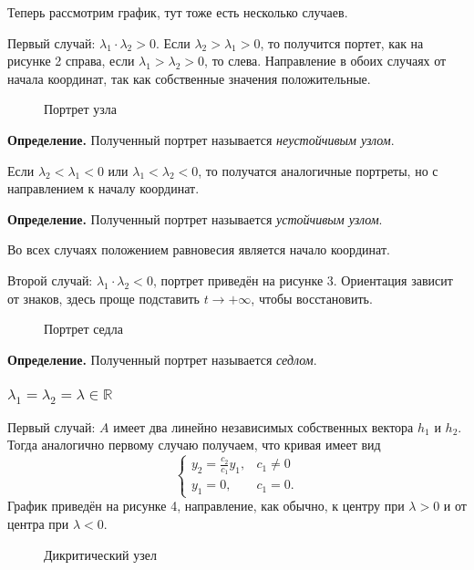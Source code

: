 Теперь рассмотрим график, тут тоже есть несколько случаев.

Первый случай: $\lambda_1 \cdot \lambda_2 > 0$.
Если $\lambda_2 > \lambda_1 > 0$, то получится портет, как на рисунке 2 справа, если $\lambda_1 > \lambda_2 > 0$, то слева.
Направление в обоих случаях от начала координат, так как собственные значения положительные.

\begin{figure}[ht]
    \centering
    \caption{Портрет узла}
\end{figure}

\textbf{Определение.} Полученный портрет называется \textit{неустойчивым узлом}.

Если $\lambda_2 < \lambda_1 < 0$ или $\lambda_1 < \lambda_2 < 0$, то получатся аналогичные портреты, но с направлением к началу координат.

\textbf{Определение.} Полученный портрет называется \textit{устойчивым узлом}.

Во всех случаях положением равновесия является начало координат.

Второй случай: $\lambda_1 \cdot \lambda_2 < 0$, портрет приведён на рисунке 3.
Ориентация зависит от знаков, здесь проще подставить $t \to +\infty$, чтобы восстановить.

\begin{figure}[ht]
    \centering
    \caption{Портрет седла}
\end{figure}

\textbf{Определение.} Полученный портрет называется \textit{седлом}.

\subsubsection{$\lambda_1 = \lambda_2 = \lambda \in \mathbb R$}
Первый случай: $A$ имеет два линейно независимых собственных вектора $h_1$ и $h_2$.
Тогда аналогично первому случаю получаем, что кривая имеет вид
\[
    \begin{cases}
        y_2 = \frac{c_2}{c_1} y_1, & c_1 \ne 0 \\
        y_1 = 0, & c_1 = 0.
    \end{cases}
\]
График приведён на рисунке 4, направление, как обычно, к центру при $\lambda > 0$ и от центра при $\lambda < 0$.

\begin{figure}[ht]
    \centering
    \caption{Дикритический узел}
\end{figure}

